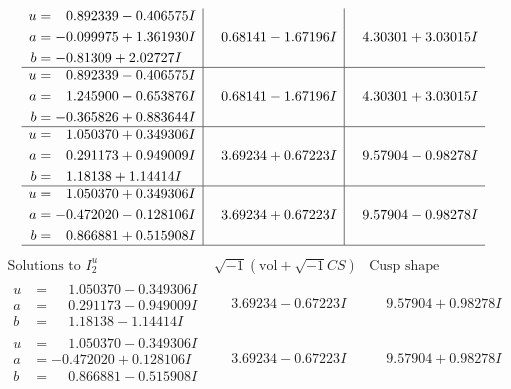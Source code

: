 \documentclass[1p]{elsarticle_modified}
\theoremstyle{definition}
\newcommand{\I}{\sqrt{-1}}
\begin{document}
$$\begin{array}{c|c|c}
\begin{aligned}
u &= \phantom{-}0.892339 - 0.406575 I \\
a &= -0.099975 + 1.361930 I \\
b &= -0.81309 + 2.02727 I\end{aligned}
 & \phantom{-}0.68141 - 1.67196 I & \phantom{-}4.30301 + 3.03015 I \\ \hline\begin{aligned}
u &= \phantom{-}0.892339 - 0.406575 I \\
a &= \phantom{-}1.245900 - 0.653876 I \\
b &= -0.365826 + 0.883644 I\end{aligned}
 & \phantom{-}0.68141 - 1.67196 I & \phantom{-}4.30301 + 3.03015 I \\ \hline\begin{aligned}
u &= \phantom{-}1.050370 + 0.349306 I \\
a &= \phantom{-}0.291173 + 0.949009 I \\
b &= \phantom{-}1.18138 + 1.14414 I\end{aligned}
 & \phantom{-}3.69234 + 0.67223 I & \phantom{-}9.57904 - 0.98278 I \\ \hline\begin{aligned}
u &= \phantom{-}1.050370 + 0.349306 I \\
a &= -0.472020 - 0.128106 I \\
b &= \phantom{-}0.866881 + 0.515908 I\end{aligned}
 & \phantom{-}3.69234 + 0.67223 I & \phantom{-}9.57904 - 0.98278 I\\
 \hline 
 \end{array}$$\newpage$$\begin{array}{c|c|c}  
\text{Solutions to }I^u_{2}& \I (\text{vol} + \sqrt{-1}CS) & \text{Cusp shape}\\
 \hline 
\begin{aligned}
u &= \phantom{-}1.050370 - 0.349306 I \\
a &= \phantom{-}0.291173 - 0.949009 I \\
b &= \phantom{-}1.18138 - 1.14414 I\end{aligned}
 & \phantom{-}3.69234 - 0.67223 I & \phantom{-}9.57904 + 0.98278 I \\ \hline\begin{aligned}
u &= \phantom{-}1.050370 - 0.349306 I \\
a &= -0.472020 + 0.128106 I \\
b &= \phantom{-}0.866881 - 0.515908 I\end{aligned}
 & \phantom{-}3.69234 - 0.67223 I & \phantom{-}9.57904 + 0.98278 I \\ \hline\begin{aligned}

\end{aligned}
\end{array}$$
\end{document}

